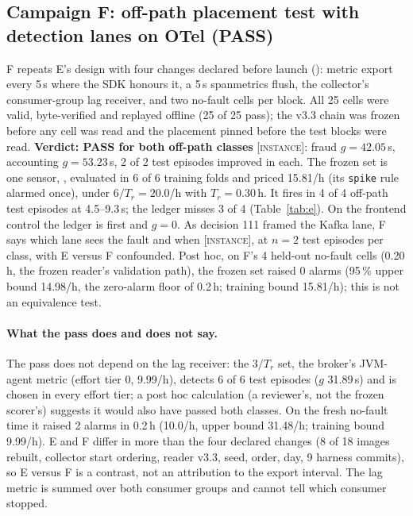 \documentclass{ceurart}
\newcommand{\scope}[1]{\textsc{[#1]}}
\begin{document}
\subsection{Campaign F: off-path placement test with detection lanes on OTel (PASS)}\label{sec:f}
F repeats E's design with four changes declared before launch (): metric export every
5\,s where the SDK honours it, a 5\,s spanmetrics flush, the collector's consumer-group lag receiver, and two no-fault
cells per block. All 25 cells were valid, byte-verified and replayed offline (25 of 25 pass); the v3.3 chain was frozen before any
cell was read and the placement pinned before the test blocks were read.
\textbf{Verdict: PASS for both off-path classes} \scope{instance}: fraud $g = 42.05$\,s, accounting $g = 53.23$\,s, 2 of
2 test episodes improved in each. The frozen set is one sensor, , evaluated
in 6 of 6 training folds and priced 15.81/h (its \texttt{spike} rule alarmed once), under $6/T_r = 20.0$/h with
$T_r = 0.30$\,h. It fires in 4 of 4 off-path test episodes at 4.5--9.3\,s; the ledger misses 3 of 4
(Table~\ref{tab:e}). On the frontend control the ledger is first and $g = 0$. As decision 111
framed the Kafka lane, F says which lane sees the fault and when \scope{instance}, at $n = 2$ test episodes per class,
with E versus F confounded. Post hoc, on F's 4 held-out no-fault cells (0.20\,h, the frozen reader's validation path),
the frozen set raised 0 alarms (95\,\% upper bound 14.98/h, the zero-alarm floor of 0.2\,h; training bound 15.81/h);
this is not an equivalence test. %

\paragraph{What the pass does and does not say.} The pass does not depend on the lag receiver: the $3/T_r$ set, the
broker's JVM-agent metric  (effort tier 0, 9.99/h), detects 6 of 6 test episodes
($g$ 31.89\,s) and is chosen in every effort tier; a post hoc calculation (a reviewer's, not the frozen scorer's)
suggests it would also have passed both classes. On the fresh no-fault time it raised 2 alarms in 0.2\,h (10.0/h, upper
bound 31.48/h; training bound 9.99/h). %
E and F differ in more than the four declared changes (8 of 18 images rebuilt, collector start ordering, reader v3.3,
seed, order, day, 9 harness commits), so E versus F is a contrast, not an attribution to the export interval. The lag
metric is summed over both consumer groups and cannot tell which consumer stopped.
\end{document}
